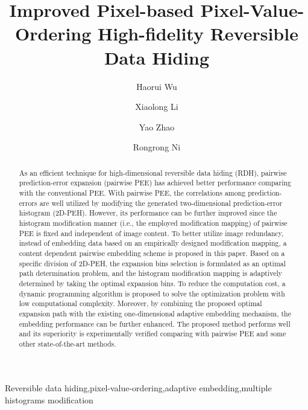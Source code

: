 \documentclass[review,3p,10pt,sort&compress]{elsarticle}
\begin{document}
\begin{frontmatter}

\title {Improved Pixel-based Pixel-Value-Ordering High-fidelity Reversible Data Hiding}

\author{Haorui Wu}

\author{Xiaolong Li}

\author{Yao Zhao}

\author{Rongrong Ni}

\address[mymainaddress]{Institute of Information Science, Beijing Jiaotong University, Beijing 100044, China}
\address[mysecondaryaddress]{Beijing Key Laboratory of Advanced Information Science and Network Technology, Beijing 100044, China}

\begin{abstract}
As an efficient technique for high-dimensional reversible data hiding (RDH), pairwise prediction-error expansion (pairwise PEE) has achieved better performance comparing with the conventional PEE. With pairwise PEE, the correlations among prediction-errors are well utilized by modifying the generated two-dimensional prediction-error histogram (2D-PEH). However, its performance can be further improved since the histogram modification manner (i.e., the employed modification mapping) of pairwise PEE is fixed and independent of image content. To better utilize image redundancy, instead of embedding data based on an empirically designed modification mapping, a content dependent pairwise embedding scheme is proposed in this paper. Based on a specific division of 2D-PEH, the expansion bins selection is formulated as an optimal path determination problem, and the histogram modification mapping is adaptively determined by taking the optimal expansion bins. To reduce the computation cost, a dynamic programming algorithm is proposed to solve the optimization problem with low computational complexity. Moreover, by combining the proposed optimal expansion path with the existing one-dimensional adaptive embedding mechanism, the embedding performance can be further enhanced. The proposed method performs well and its superiority is experimentally verified comparing with pairwise PEE and some other state-of-the-art methods.
\end{abstract}


\begin{keyword}
   Reversible data hiding\sep pixel-value-ordering\sep adaptive embedding\sep multiple histograms modification
\end{keyword}

\end{frontmatter}
\end{document}
